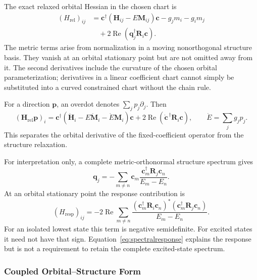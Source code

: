 \documentclass[12pt]{article}
\begin{document}
The exact relaxed orbital Hessian in the chosen chart is
\begin{equation}
 \boxed{
 \begin{aligned}
 (H_{\mathrm{rel}})_{ij}
 &=\mathbf c^\dagger(\mathbf H_{ij}-E\mathbf M_{ij})\mathbf c
   -g_jm_i-g_im_j\\
 &\quad+2\operatorname{Re}(\mathbf q_j^\dagger\mathbf R_i\mathbf c).
 \end{aligned}}
 \label{eq:relaxedhessian}
\end{equation}
The metric terms arise from normalization in a moving nonorthogonal structure basis. They vanish at an orbital stationary point but are not omitted away from it. The second derivatives include the curvature of the chosen orbital parameterization; derivatives in a linear coefficient chart cannot simply be substituted into a curved constrained chart without the chain rule.

For a direction \(\mathbf p\), an overdot denotes \(\sum_jp_j\partial_j\). Then
\begin{equation}
 \boxed{
 (\mathbf H_{\mathrm{rel}}\mathbf p)_i
 =\mathbf c^\dagger(\dot{\mathbf H}_i-E\dot{\mathbf M}_i
                         -\dot E\mathbf M_i)\mathbf c
 +2\operatorname{Re}(\dot{\mathbf c}^{\,\dagger}\mathbf R_i\mathbf c),
 \qquad \dot E=\sum_jg_jp_j.}
 \label{eq:hvp}
\end{equation}
This separates the orbital derivative of the fixed-coefficient operator from the structure relaxation.

For interpretation only, a complete metric-orthonormal structure spectrum gives
\begin{equation}
 \mathbf q_j=-\sum_{m\ne n}\mathbf c_m
 \frac{\mathbf c_m^\dagger\mathbf R_j\mathbf c_n}{E_m-E_n}.
 \label{eq:spectralresponse}
\end{equation}
At an orbital stationary point the response contribution is
\begin{equation}
 (H_{\mathrm{resp}})_{ij}
 =-2\operatorname{Re}\sum_{m\ne n}
 \frac{(\mathbf c_m^\dagger\mathbf R_i\mathbf c_n)^*
             (\mathbf c_m^\dagger\mathbf R_j\mathbf c_n)}{E_m-E_n}.
 \label{eq:spectralcurvature}
\end{equation}
For an isolated lowest state this term is negative semidefinite. For excited states it need not have that sign. Equation~\eqref{eq:spectralresponse} explains the response but is not a requirement to retain the complete excited-state spectrum.

\subsubsection{Coupled Orbital--Structure Form}
\end{document}
